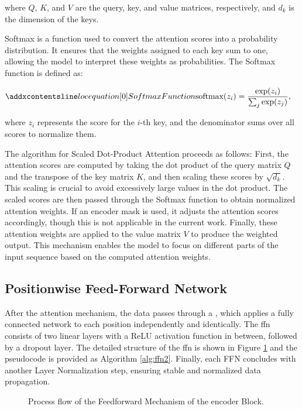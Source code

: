 where $Q$, $K$, and $V$ are the query, key, and value matrices, respectively, and $d_k$ is the dimension of the keys.

Softmax is a function used to convert the attention scores into a probability distribution. It ensures that the weights assigned to each key sum to one, allowing the model to interpret these weights as probabilities. The Softmax function is defined as:

\begin{align}
\setequationentry{Softmax Function}
    \text{softmax}(z_i) &= \frac{\exp(z_i)}{\sum_{j} \exp(z_j)},
\end{align}

where \( z_i \) represents the score for the \( i \)-th key, and the denominator sums over all scores to normalize them.

The algorithm for Scaled Dot-Product Attention proceeds as follows: First, the attention scores are computed by taking the dot product of the query matrix $Q$ and the transpose of the key matrix $K$, and then scaling these scores by \( \sqrt{d_k} \). This scaling is crucial to avoid excessively large values in the dot product. The scaled scores are then passed through the Softmax function to obtain normalized attention weights. If an encoder mask is used, it adjusts the attention scores accordingly, though this is not applicable in the current work. Finally, these attention weights are applied to the value matrix $V$ to produce the weighted output. This mechanism enables the model to focus on different parts of the input sequence based on the computed attention weights.


\subsection{Positionwise Feed-Forward Network}
\label{sec:ffn}
After the attention mechanism, the data passes through a , which applies a fully connected network to each position independently and identically. The \gls{ffn} consists of two linear layers with a ReLU activation function in between, followed by a dropout layer. The detailed structure of the \gls{ffn} is shown in Figure \ref{fig:ffn} and the pseudocode is provided as Algorithm \ref{alg:ffn2}. Finally, each FFN concludes with another Layer Normalization step, ensuring stable and normalized data propagation.

\begin{figure}[t]
    \centering
    
    \caption{Process flow of the Feedforward Mechanism of the encoder Block.}
    \label{fig:ffn}
\end{figure}

